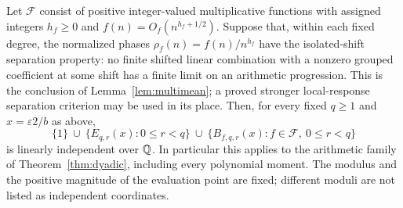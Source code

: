 \begin{theorem}\label{thm:periodic-transfer}
Let $\mathcal F$ consist of positive integer-valued multiplicative
functions with assigned integers $h_f\geq0$ and
$f(n)=O_f(n^{h_f+1/2})$. Suppose that, within each fixed degree, the
normalized phases $\rho_f(n)=f(n)/n^{h_f}$ have the isolated-shift
separation property: no finite shifted linear combination with a
nonzero grouped coefficient at some shift has a finite limit on an
arithmetic progression. This is the conclusion of
Lemma~\ref{lem:multimean}; a proved stronger local-response separation
criterion may be used in its place.
Then, for every fixed $q\geq1$ and $x=\varepsilon2/b$ as above,
\begin{equation}\label{eq:periodic-family}
 \{1\}\ \cup\ \{E_{q,r}(x):0\leq r<q\}
 \ \cup\ \{B_{f,q,r}(x):f\in\mathcal F,\ 0\leq r<q\}
\end{equation}
is linearly independent over $\mathbb Q$.
In particular this applies to the arithmetic family of
Theorem~\ref{thm:dyadic}, including every polynomial moment.
The modulus and the positive magnitude of the evaluation point are
fixed; different moduli are not listed as independent coordinates.
\end{theorem}
